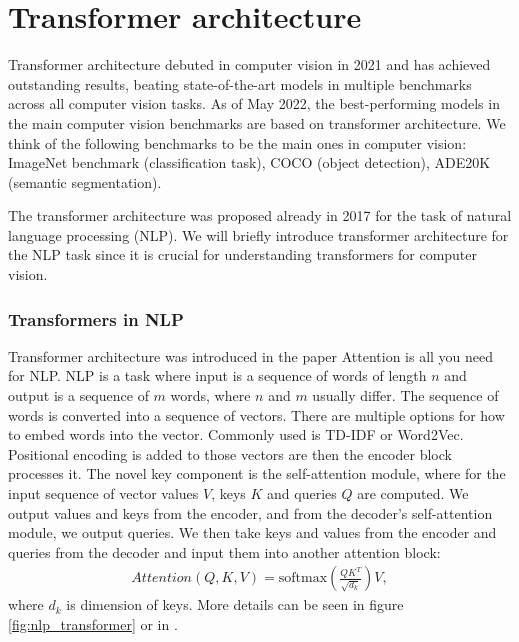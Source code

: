 \section{Transformer architecture}
Transformer architecture debuted in computer vision in 2021 and has achieved outstanding results, beating state-of-the-art models in multiple benchmarks across all computer vision tasks. As of May 2022, the best-performing models in the main computer vision benchmarks are based on transformer architecture. We think of the following benchmarks to be the main ones in computer vision:  ImageNet benchmark (classification task), COCO (object detection), ADE20K (semantic segmentation).

The transformer architecture was proposed already in 2017 for the task of natural language processing (NLP). We will briefly introduce transformer architecture for the NLP task since it is crucial for understanding transformers for computer vision.

\subsubsection{Transformers in NLP}
Transformer architecture was introduced in the paper Attention is all you need \cite{Vaswani2017} for NLP. NLP is a task where input is a sequence of words of length $n$ and output is a sequence of $m$ words, where $n$ and $m$ usually differ. The sequence of words is converted into a sequence of vectors. There are multiple options for how to embed words into the vector. Commonly used is TD-IDF or Word2Vec\cite{Li2018}. Positional encoding is added to those vectors are then the encoder block processes it. The novel key component is the self-attention module, where for the input sequence of vector values $V$, keys $K$ and queries $Q$ are computed. We output values and keys from the encoder, and from the decoder's self-attention module, we output queries. We then take keys and values from the encoder and queries from the decoder and input them into another attention block:
\begin{align}
    Attention \left(Q,K,V \right) = \text{softmax} \left( \frac{QK^T}{\sqrt{d_k}} \right)V,
\end{align}
where $d_k$ is dimension of keys. More details can be seen in figure \ref{fig:nlp_transformer} or in \cite{Vaswani2017}.

